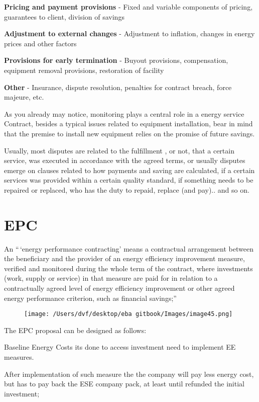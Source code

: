 \documentclass[]{book}
\theoremstyle{definition}
\theoremstyle{definition}
\theoremstyle{definition}
\theoremstyle{remark}
\begin{document}
\textbf{Pricing and payment provisions} - Fixed and variable components
of pricing, guarantees to client, division of savings

\textbf{Adjustment to external changes} - Adjustment to inflation,
changes in energy prices and other factors

\textbf{Provisions for early termination} - Buyout provisions,
compensation, equipment removal provisions, restoration of facility

\textbf{Other} - Insurance, dispute resolution, penalties for contract
breach, force majeure, etc.

As you already may notice, monitoring plays a central role in a energy
service Contract, besides a typical issues related to equipment
installation, bear in mind that the premise to install new equipment
relies on the promise of future savings.

Usually, most disputes are related to the fulfillment , or not, that a
certain service, was executed in accordance with the agreed terms, or
usually disputes emerge on clauses related to how payments and saving
are calculated, if a certain services was provided within a certain
quality standard, if something needs to be repaired or replaced, who has
the duty to repaid, replace (and pay).. and so on.

\section{EPC}\label{epc}

An ``\,`energy performance contracting' means a contractual arrangement
between the beneficiary and the provider of an energy efficiency
improvement measure, verified and monitored during the whole term of the
contract, where investments (work, supply or service) in that measure
are paid for in relation to a contractually agreed level of energy
efficiency improvement or other agreed energy performance criterion,
such as financial savings;''

\begin{figure}[htbp]
\centering
\texttt{[image: /Users/dvf/desktop/eba gitbook/Images/image45.png]}
\caption{}
\end{figure}

The EPC proposal can be designed as follows:

Baseline Energy Costs its done to access investment need to implement EE
measures.

After implementation of such measure the the company will pay less
energy cost, but has to pay back the ESE company pack, at least until
refunded the initial investment;
\end{document}
